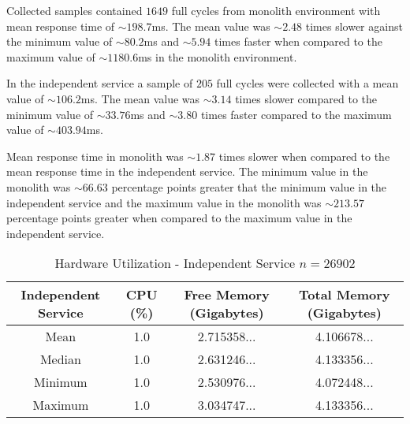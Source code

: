 Collected samples contained $1649$ full cycles from monolith environment with mean response time of $\sim198.7$ms.
The mean value was $\sim2.48$ times slower against the minimum value of $\sim 80.2$ms and $\sim5.94$ times faster when compared to the maximum value of $\sim1180.6$ms in the monolith environment.

In the independent service a sample of $205$ full cycles were collected with a mean value of $\sim106.2$ms.
The mean value was $\sim3.14$ times slower compared to the minimum value of $\sim 33.76$ms and $\sim3.80$ times faster compared to the maximum value of $\sim 403.94$ms.

Mean response time in monolith was $\sim1.87$ times slower when compared to the mean response time in the independent service.
The minimum value in the monolith was $\sim 66.63$ percentage points greater that the minimum value in the independent service and the maximum value in the monolith was $\sim 213.57$ percentage points greater when compared to the maximum value in the independent service.

\begin{table}[ht!]
       \begin{tabular}{|c c c c|} 
        \hline
        Independent Service
        & CPU (\%)
        & Free Memory (Gigabytes)
        & Total Memory (Gigabytes) \\ [0.5ex] 
        
        \hline\hline
        Mean
        & 1.0
        & 2.715358... 
        & 4.106678...
        \\
        
        Median
        & 1.0
        & 2.631246...
        & 4.133356...
        \\ 

        Minimum
        & 1.0
        & 2.530976...
        & 4.072448...
        \\ 
        
        Maximum
        & 1.0
        & 3.034747...
        & 4.133356...
        \\
        \hline
    \end{tabular}
    \caption{Hardware Utilization - Independent Service $n=26902$}
    \label{table:hardware results:independent service:1}
\end{table}

